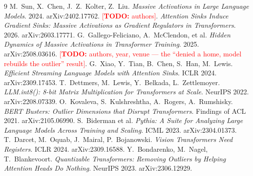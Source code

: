 \documentclass[11pt]{article}
\newcommand{\todo}[1]{\textcolor{red}{[\textbf{TODO:} #1]}}
\begin{document}

\begin{thebibliography}{9}
 M.~Sun, X.~Chen, J.~Z.~Kolter, Z.~Liu.
\emph{Massive Activations in Large Language Models}. 2024. arXiv:2402.17762.
 \todo{authors}.
\emph{Attention Sinks Induce Gradient Sinks: Massive Activations as Gradient
Regulators in Transformers}. 2026. arXiv:2603.17771.
 G.~Gallego-Feliciano,
A.~McClendon, et al. \emph{Hidden Dynamics of Massive Activations in Transformer
Training}. 2025. arXiv:2508.03616.
 \todo{authors, year, venue --- the ``denied a home,
model rebuilds the outlier'' result}.
 G.~Xiao, Y.~Tian, B.~Chen, S.~Han,
M.~Lewis. \emph{Efficient Streaming Language Models with Attention Sinks}. ICLR 2024.
arXiv:2309.17453.
 T.~Dettmers, M.~Lewis,
Y.~Belkada, L.~Zettlemoyer. \emph{LLM.int8(): 8-bit Matrix Multiplication for
Transformers at Scale}. NeurIPS 2022. arXiv:2208.07339.
 O.~Kovaleva, S.~Kulshreshtha,
A.~Rogers, A.~Rumshisky. \emph{BERT Busters: Outlier Dimensions that Disrupt
Transformers}. Findings of ACL 2021. arXiv:2105.06990.
 S.~Biderman et al.
\emph{Pythia: A Suite for Analyzing Large Language Models Across Training and
Scaling}. ICML 2023. arXiv:2304.01373.
 T.~Darcet, M.~Oquab, J.~Mairal,
P.~Bojanowski. \emph{Vision Transformers Need Registers}. ICLR 2024.
arXiv:2309.16588.
 Y.~Bondarenko,
M.~Nagel, T.~Blankevoort. \emph{Quantizable Transformers: Removing Outliers by
Helping Attention Heads Do Nothing}. NeurIPS 2023. arXiv:2306.12929.
\end{thebibliography}
\end{document}
